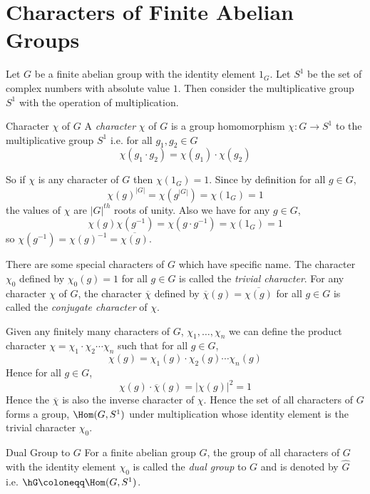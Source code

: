 \section{Characters of Finite Abelian Groups}
Let $G$ be a finite abelian group with the identity element $1_G$. Let $S^1$ be the set of complex numbers with absolute value $1$. Then consider the multiplicative group $S^1$ with the operation of multiplication.
\begin{Definition}{Character $\chi$ of $G$}{}
  A \emph{character} $\chi$ of $G$ is a group homomorphism $\chi:G\to S^1$ to the multiplicative group $S^1$ i.e. for all $g_1,g_2\in G$ $$\chi(g_1\cdot g_2)=\chi(g_1)\cdot \chi(g_2)$$
\end{Definition}

So if $\chi$ is any character of $G$ then $\chi(1_G)=1$. Since by definition for all $g\in G$, $$\chi(g)^{|G|}=\chi(g^{|G|})=\chi(1_G)=1$$ the values of $\chi$ are $|G|^{th}$ roots of unity. Also we have for any $g\in G$, $$\chi(g)\chi(g^{-1})=\chi(g\cdot g^{-1})=\chi(1_G)=1$$ so $\chi(g^{-1})=\chi(g)^{-1}=\overline{\chi(g)}$.

There are some special characters of $G$ which have specific name. The character $\chi_0$ defined by $\chi_0(g)=1$ for all $g\in G$ is called the \emph{trivial character}. For any character $\chi$ of $G$, the character $\overline{\chi}$ defined by $\overline{\chi}(g)=\overline{\chi(g)}$ for all $g\in G$ is called the \emph{conjugate character} of $\chi$.

Given any finitely many characters of $G$, $\chi_1,\dots, \chi_n$ we can define the product character $\chi=\chi_1\cdot \chi_2\cdots \chi_n$ such that for all $g\in G$, $$\chi(g)=\chi_1(g)\cdot \chi_2(g)\cdots \chi_n(g)$$
Hence for all $g\in G$, $$\chi(g)\cdot \overline{\chi}(g)=|\chi(g)|^2=1$$Hence the $\overline{\chi}$ is also the inverse character of $\chi$. Hence the set of all characters of $G$ forms a group, $\Hom(G,S^1)$ under multiplication whose identity element is the trivial character $\chi_0$.
\begin{Definition}{Dual Group to $G$}{}
  For a finite abelian group $G$, the group of all characters of $G$ with the identity element $\chi_0$ is called the \emph{dual group} to $G$ and is denoted by $\widehat{G}$ i.e. $\hG\coloneqq \Hom(G,S^1)$.
\end{Definition}

